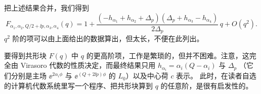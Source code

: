 
把上述结果合并，我们得到
\begin{equation}
  F_{\alpha_1,\alpha_2,Q/2+\ii p,\alpha_3,\alpha_4}(q)
  = 1 + \frac{(-h_{\alpha_1}+h_{\alpha_2}+\Delta_p)(\Delta_p+h_{\alpha_3}-h_{\alpha_4})}{2\Delta_p}
    \,q + O(q^2).
  \tag{2.72}
\end{equation}
$q^2$ 阶的项可以由上面给出的数据算出，但太长，不便在此列出。


要得到共形块 $F(q)$ 中 $q$ 的更高阶项，工作是繁琐的，但并不困难。注意，这完全由 Virasoro
代数的性质决定，而最终结果只用 $h_{\alpha_i}=\alpha_i(Q-\alpha_i)$ 与 $\Delta_p$
（它们分别是主场 $\ee^{2\alpha_i\phi}$ 与 $\ee^{(Q+2\ii p)\phi}$ 的 $L_0$）以及中心荷 $c$ 表示。
此时，在读者自选的计算机代数系统里写一个程序、把共形块算到 $q$ 的任意阶，是很有启发性的。

